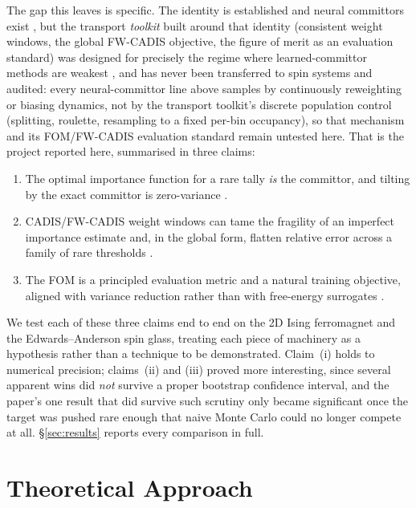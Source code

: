 \documentclass[a4paper,fleqn]{cas-sc}
\begin{document}
The gap this leaves is specific. The identity is established \cite{doob1984, chetrite2015}
and neural committors exist \cite{li2019, khoo2019, kim2026, trizio2025}, but the transport
\emph{toolkit} built around that identity (consistent weight windows, the global
FW-CADIS objective, the figure of merit as an evaluation standard) was designed for
precisely the regime where learned-committor methods are weakest \cite{wagner1998,
	wagnerfw2014}, and has never been transferred to spin systems and audited: every
neural-committor line above samples by continuously reweighting or biasing dynamics, not
by the transport toolkit's discrete population control (splitting, roulette, resampling
to a fixed per-bin occupancy), so that mechanism and its FOM/FW-CADIS evaluation standard
remain untested here. That is the project reported here, summarised in three claims:
\begin{enumerate}[itemsep=2pt]
	\item The optimal importance function for a rare tally \emph{is} the committor, and
	tilting by the exact committor is zero-variance \cite{doob1984, chetrite2015}.
	\item CADIS/FW-CADIS weight windows can tame the fragility of an imperfect importance
	estimate and, in the global form, flatten relative error across a family of rare
	thresholds \cite{wagner1998, wagnerfw2014}.
	\item The FOM is a principled evaluation metric and a natural training objective,
	aligned with variance reduction rather than with free-energy surrogates
	\cite{spanier1969, wanglandau2001}.
\end{enumerate}

We test each of these three claims end to end on the 2D Ising ferromagnet and the
Edwards--Anderson spin glass, treating each piece of machinery as a hypothesis rather than
a technique to be demonstrated. Claim~(i) holds to numerical precision; claims~(ii) and
(iii) proved more interesting, since several apparent wins did \emph{not} survive a proper
bootstrap confidence interval, and the paper's one result that did survive such scrutiny
only became significant once the target was pushed rare enough that naive Monte Carlo
could no longer compete at all. \S\ref{sec:results} reports every comparison in full.

\FloatBarrier

\section{Theoretical Approach}\label{sec:methods}
\end{document}
